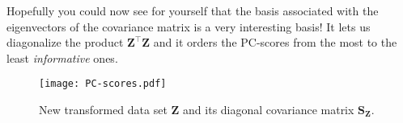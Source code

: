 \documentclass[10pt,twocolumn]{article}
\begin{document}
Hopefully you could now see for yourself that the basis associated with the eigenvectors of the covariance matrix is a very interesting basis! It lets us diagonalize the product $\mathbf{Z}^{\top} \mathbf{Z}$ and it orders the PC-scores from the most to the least \textit{informative} ones.
\begin{figure}[t]
\centering\texttt{[image: PC-scores.pdf]}
\caption{New transformed data set $\mathbf{Z}$ and its diagonal covariance matrix $\mathbf{S_Z}$.}
\label{fig:PC-scores}
\end{figure}

%
%
\end{document}
